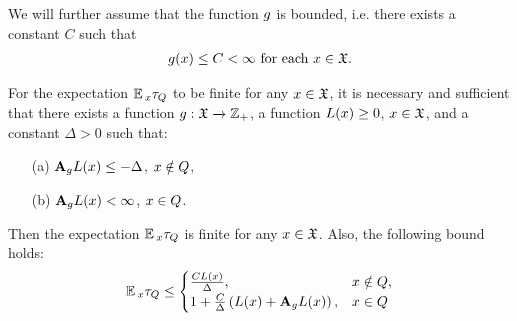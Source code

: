	We will further assume that the function $g$ is bounded, i.e. there exists a constant $C$ such that
	\begin{gather}
	g(x) \leq C < \infty \text{ for each } x \in \mathfrak{X}.
	\label{g_assumption}
	\end{gather}
	
	\begin{repeated_corollary}
		For the expectation $\operatorname*{\mathbb{E}}{}_{x}\tau_{Q}$ to be finite for any $x \in \mathfrak{X}$, it is necessary and sufficient that there exists a function $g:\mathfrak{X} \xrightarrow{} \mathbb{Z}_{+}$, a function $L(x) \geq 0$, $x \in \mathfrak{X}$, and a constant $\Delta > 0$ such that:
		\begin{enumerate}
			\item[(a)] $\mathbf{A}_{g}L(x) \leq -\Delta$, $x \notin Q$,
			\item[(b)] $\mathbf{A}_{g}L(x) < \infty$, $x \in Q$.
		\end{enumerate}
		Then the expectation $\operatorname*{\mathbb{E}}{}_{x}\tau_{Q}$ is finite for any $x \in \mathfrak{X}$. Also, the following bound holds:
		\begin{align}
		\operatorname*{\mathbb{E}}{}_{x}\tau_{Q} \leq \begin{cases}
		\frac{CL(x)}{\Delta}, & x \notin Q, \\
		1 + \frac{C}{\Delta}\left(L(x) + \mathbf{A}_{g}L(x)\right), & x \in Q
		\end{cases}
		\label{corollary_1_bound}
		\end{align}
	\end{repeated_corollary}
